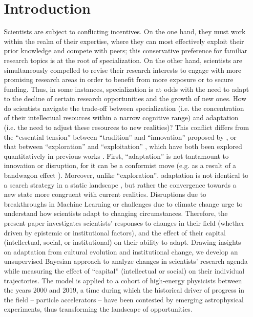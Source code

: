 \documentclass{article}
\begin{document}

\section{Introduction}

Scientists are subject to conflicting incentives. On the one hand, they must work within the realm of their expertise, where they can most effectively exploit their prior knowledge and compete with peers; this conservative preference for familiar research topics is at the root of specialization. On the other hand, scientists are simultaneously compelled to revise their research interests to engage with more promising research areas in order to benefit from more exposure or to secure funding. Thus, in some instances, specialization is at odds with the need to adapt to the decline of certain research opportunities and the growth of new ones. How do scientists navigate the trade-off between specialization (i.e. the concentration of their intellectual resources within a narrow cognitive range) and adaptation (i.e. the need to adjust these resources to new realities)? This conflict differs from the ``essential tension'' between ``tradition'' and ``innovation'' proposed by \citet{Kuhn1997}, or that between ``exploration'' and ``exploitation'' \citep{March1991}, which have both been explored quantitatively in previous works \citep{Foster2015,Jia2017,Aleta2019,Zeng2019,Tripodi2020,Singh2024,liu2024science}%
. First, ``adaptation'' is not tantamount to innovation or disruption, for it can be a conformist move (e.g. as a result of a bandwagon effect \citep{Fujimura1988}). Moreover,  unlike ``exploration'', adaptation is not identical to a search strategy in a static landscape \citep{Galesic2023}, but rather the convergence towards a new state more congruent with current realities. Disruptions due to breakthroughs in Machine Learning or challenges due to climate change urge to understand how scientists adapt to changing circumstances. Therefore, the present paper investigates scientists' responses to changes in their field (whether driven by epistemic or institutional factors), and the effect of their capital (intellectual, social, or institutional) on their ability to adapt. Drawing insights on adaptation from cultural evolution and institutional change, we develop an unsupervised Bayesian approach to analyze changes in scientists' research agenda while measuring the effect of ``capital'' (intellectual or social) on their individual trajectories. The model is applied to a cohort of high-energy physicists between the years 2000 and 2019, a time during which the historical driver of progress in the field -- particle accelerators -- have been contested by emerging astrophysical experiments, thus transforming the landscape of opportunities.
\end{document}
